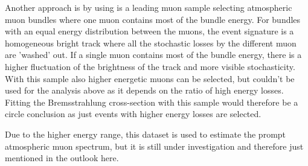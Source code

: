 Another approach is by using is a leading muon sample selecting atmospheric muon bundles where one muon contains most of the bundle energy.
For bundles with an equal energy distribution between the muons, the event signature is a homogeneous bright track where all the stochastic losses by the different muon are 'washed' out.
If a single muon contains most of the bundle energy, there is a higher fluctuation of the brightness of the track and more visible stochasticity.
With this sample also higher energetic muons can be selected, but couldn't be used for the analysis above as it depends on the ratio of high energy losses.
Fitting the Bremsstrahlung cross-section with this sample would therefore be a circle conclusion as just events with higher energy losses are selected.

Due to the higher energy range, this dataset is used to estimate the prompt atmospheric muon spectrum, but it is still under investigation and therefore just mentioned in the outlook here.
\cite{IceCube2019SnowStorm}


